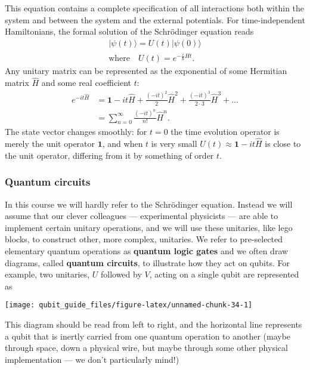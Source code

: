 \documentclass[fleqn]{article}
\begin{document}
This equation contains a complete specification of all interactions both within the system and between the system and the external potentials.
For time-independent Hamiltonians, the formal solution of the Schrödinger equation reads
\[
  \begin{gathered}
    |\psi(t)\rangle = U(t) |\psi(0)\rangle
  \\\text{where}\quad U(t) = e^{-\frac{i}{\hbar}\hat{H}t}.
  \end{gathered}
\]
Any unitary matrix can be represented as the exponential of some Hermitian matrix \(\hat{H}\) and some real coefficient \(t\):
\[
  \begin{aligned}
    e^{-it\hat{H}}
    &= \mathbf{1}- it\hat{H} + \frac{(-it)^2}{2}\hat{H}^2 + \frac{(-it)^3}{2\cdot3}\hat{H}^3 +\ldots
  \\&= \sum_{n=0}^\infty \frac{(-it)^n}{n!}\hat{H}^n.
  \end{aligned}
\]
The state vector changes smoothly: for \(t=0\) the time evolution operator is merely the unit operator \(\mathbf{1}\), and when \(t\) is very small \(U(t)\approx \mathbf{1}-it\hat{H}\) is close to the unit operator, differing from it by something of order \(t\).

\hypertarget{quantum-circuits}{%
\subsubsection{Quantum circuits}\label{quantum-circuits}}

In this course we will hardly refer to the Schrödinger equation.
Instead we will assume that our clever colleagues --- experimental physicists --- are able to implement certain unitary operations, and we will use these unitaries, like lego blocks, to construct other, more complex, unitaries.
We refer to pre-selected elementary quantum operations as \textbf{quantum logic gates} and we often draw diagrams, called \textbf{quantum circuits}, to illustrate how they act on qubits.
For example, two unitaries, \(U\) followed by \(V\), acting on a single qubit are represented as

\begin{center}\texttt{[image: qubit\_guide\_files/figure-latex/unnamed-chunk-34-1]} \end{center}

This diagram should be read from left to right, and the horizontal line represents a qubit that is inertly carried from one quantum operation to another (maybe through space, down a physical wire, but maybe through some other physical implementation --- we don't particularly mind!)
\end{document}
